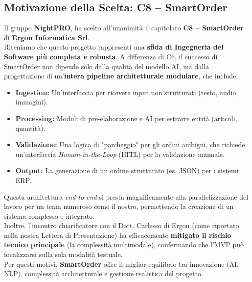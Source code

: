 \documentclass[a4paper, 11pt, oneside]{scrartcl} %
\begin{document}
\subsection*{Motivazione della Scelta: C8 – SmartOrder}

Il gruppo \textbf{NightPRO}, ha scelto all'unanimità il capitolato \textbf{C8 – SmartOrder} di \textbf{Ergon Informatica Srl}.
\\[0.6em]
Riteniamo che questo progetto rappresenti una \textbf{sfida di Ingegneria del Software più completa e robusta}. A differenza di C6, il successo di SmartOrder non dipende solo dalla qualità del modello AI, ma dalla progettazione di un'\textbf{intera pipeline architetturale modulare}, che include:
\begin{itemize}
    \item \textbf{Ingestion:} Un'interfaccia per ricevere input non strutturati (testo, audio, immagini).
    \item \textbf{Processing:} Moduli di pre-elaborazione e AI per estrarre entità (articoli, quantità).
    \item \textbf{Validazione:} Una logica di "parcheggio" per gli ordini ambigui, che richiede un'interfaccia \textit{Human-in-the-Loop} (HITL) per la validazione manuale.
    \item \textbf{Output:} La generazione di un ordine strutturato (es. JSON) per i sistemi ERP.
\end{itemize}
Questa architettura \textit{end-to-end} si presta magnificamente alla parallelizzazione del lavoro per un team numeroso come il nostro, permettendo la creazione di un sistema complesso e integrato.
\\[0.6em]
Inoltre, l'incontro chiarificatore con il Dott. Carlesso di Ergon (come riportato nella nostra Lettera di Presentazione) ha efficacemente \textbf{mitigato il rischio tecnico principale} (la complessità multimodale), confermando che l'MVP può focalizzarsi sulla sola modalità testuale.
\\[0.6em]
Per questi motivi, \textbf{SmartOrder} offre il miglior equilibrio tra innovazione (AI, NLP), complessità architetturale e gestione realistica del progetto.

\end{document}
